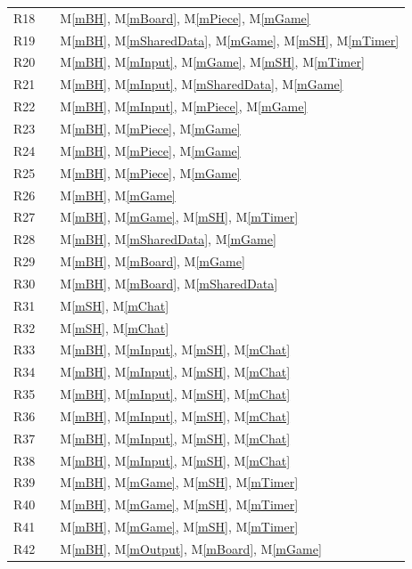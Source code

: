 \documentclass[12pt, titlepage]{article}
\newcommand{\mref}[1]{M\ref{#1}}
\begin{document}
\begin{center}
\begin{longtable}{l l l}
        R18 && \mref{mBH}, \mref{mBoard}, \mref{mPiece}, \mref{mGame}\\
        R19 && \mref{mBH}, \mref{mSharedData}, \mref{mGame}, \mref{mSH}, \mref{mTimer} \\
        R20 && \mref{mBH}, \mref{mInput}, \mref{mGame}, \mref{mSH}, \mref{mTimer}\\
        R21 && \mref{mBH}, \mref{mInput}, \mref{mSharedData}, \mref{mGame} \\
        R22 && \mref{mBH}, \mref{mInput}, \mref{mPiece}, \mref{mGame}\\
        R23 && \mref{mBH}, \mref{mPiece}, \mref{mGame}\\
        R24 && \mref{mBH}, \mref{mPiece}, \mref{mGame}\\
        R25 && \mref{mBH}, \mref{mPiece}, \mref{mGame}\\
        R26 && \mref{mBH}, \mref{mGame}\\
        R27 && \mref{mBH}, \mref{mGame}, \mref{mSH}, \mref{mTimer}\\
        R28 && \mref{mBH}, \mref{mSharedData}, \mref{mGame}\\
        R29 && \mref{mBH}, \mref{mBoard}, \mref{mGame}\\
        R30 && \mref{mBH}, \mref{mBoard}, \mref{mSharedData}\\
        R31 && \mref{mSH}, \mref{mChat}\\
        R32 && \mref{mSH}, \mref{mChat}\\
        R33 && \mref{mBH}, \mref{mInput}, \mref{mSH}, \mref{mChat}\\
        R34 && \mref{mBH}, \mref{mInput}, \mref{mSH}, \mref{mChat}\\
        R35 && \mref{mBH}, \mref{mInput}, \mref{mSH}, \mref{mChat}\\
        R36 && \mref{mBH}, \mref{mInput}, \mref{mSH}, \mref{mChat}\\
        R37 && \mref{mBH}, \mref{mInput}, \mref{mSH}, \mref{mChat}\\
        R38 && \mref{mBH}, \mref{mInput}, \mref{mSH}, \mref{mChat}\\
        R39 && \mref{mBH}, \mref{mGame}, \mref{mSH}, \mref{mTimer}\\
        R40 && \mref{mBH}, \mref{mGame}, \mref{mSH}, \mref{mTimer}\\
        R41 && \mref{mBH}, \mref{mGame}, \mref{mSH}, \mref{mTimer}\\
        R42 && \mref{mBH}, \mref{mOutput}, \mref{mBoard}, \mref{mGame}\\

\end{longtable}
\end{center}
\end{document}
